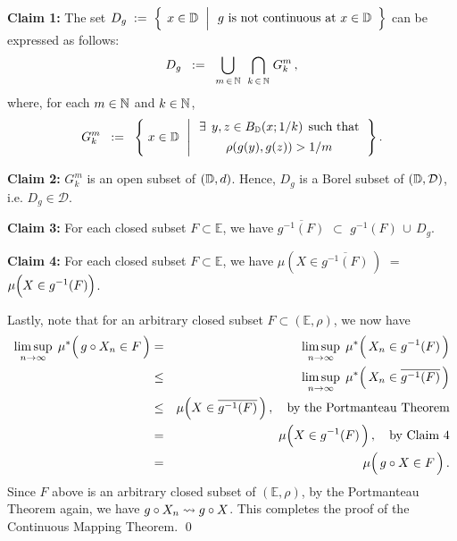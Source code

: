 \vskip 0.3cm
\noindent
\textbf{Claim 1:}\;\;
The set\;
$D_{g}
\; := \;
	\left\{\;\left.
		x\overset{{\color{white}.}}{\in}\D
		\;\;\right\vert
		\begin{array}{c}\textnormal{$g$ is not continuous at $x\in\D$}\end{array}
		\right\}$
\;can be expressed as follows:
\begin{equation*}
D_{g}
\;\; := \;\;
	\underset{m\,\in\,\mathbb{N}}{\bigcup}\;\;
	\underset{k\,\in\,\mathbb{N}}{\bigcap}\;
	G^{m}_{k}\,,
\end{equation*}
where, for each $m\in\mathbb{N}$ and $k\in\mathbb{N}$,
\begin{equation*}
G^{m}_{k}
\;\; := \;\;
	\left\{\;
		x\overset{{\color{white}.}}{\in}\D
		\;\,\left\vert\,
		\begin{array}{c} \exists \;\,y,z \in B_{\D}(x;1/k) \;\,\textnormal{such that} \\ \rho(g(y),g(z)) \overset{{\color{white}-}}{>} 1/m \end{array}
		\right.
		\right\}.
\end{equation*}

\vskip 0.5cm
\noindent
\textbf{Claim 2:}\;\;
$G^{m}_{k}$ is an open subset of $(\mathbb{D},d)$. Hence, $D_{g}$ is a Borel subset of $(\mathbb{D},\mathcal{D})$, i.e. $D_{g} \in \mathcal{D}$.

\vskip 0.5cm
\noindent
\textbf{Claim 3:}\;\;
For each closed subset $F \subset \mathbb{E}$, we have\;
$\overline{g^{-1}(F)}$ \;$\subset$\; $g^{-1}(F)\,\cup\,D_{g}$.

\vskip 0.5cm
\noindent
\textbf{Claim 4:}\;\;
For each closed subset $F \subset \mathbb{E}$, we have\;
$\mu\!\left(X\in\overline{g^{-1}(F)}\,\right)$ \;$=$\;
$\mu\!\left(X\overset{{\color{white}.}}{\in} g^{-1}(F)\right)$.

\vskip 0.5cm
\noindent
Lastly, note that for an arbitrary closed subset $F \subset (\mathbb{E},\rho)$, we now have
\begin{eqnarray*}
\underset{n\rightarrow\infty}{\limsup}\;\, \mu^{*}\!\left(\,g \circ X_{n} \overset{{\color{white}.}}{\in} F\,\right)
&=&
	\underset{n\rightarrow\infty}{\limsup}\;\, \mu^{*}\!\left(\,X_{n} \overset{{\color{white}.}}{\in} g^{-1}(F)\,\right)
\\
&\leq&
	\underset{n\rightarrow\infty}{\limsup}\;\, \mu^{*}\!\left(\,X_{n} \overset{{\color{white}.}}{\in} \overline{g^{-1}(F)}\,\right)
\\
&\leq&
	\mu\!\left(X\overset{{\color{white}.}}{\in}\overline{g^{-1}(F)}\,\right),
	\quad\textnormal{by the Portmanteau Theorem}
\\
&=&
	\mu\!\left(X\overset{{\color{white}.}}{\in}g^{-1}(F)\,\right),
	\quad\textnormal{by Claim 4}
\\
&=&
	\mu\!\left(\,g \circ X\overset{{\color{white}.}}{\in}F\,\right).
\end{eqnarray*}
Since $F$ above is an arbitrary closed subset of $(\mathbb{E},\rho)$,
by the Portmanteau Theorem again, we have \;$g \circ X_{n} \rightsquigarrow g \circ X$.
This completes the proof of the Continuous Mapping Theorem.
\qed

